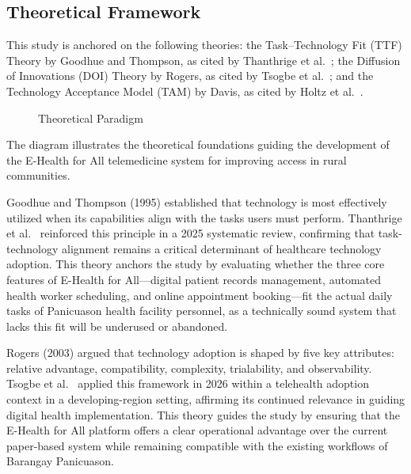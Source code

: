 \documentclass{research}
\begin{document}
\subsection*{Theoretical Framework}

This study is anchored on the following theories: the Task--Technology Fit (TTF) Theory by
Goodhue and Thompson, as cited by Thanthrige et al.\ \cite{Thanthrige2025}; the Diffusion of
Innovations (DOI) Theory by Rogers, as cited by Tsogbe et al.\ \cite{Tsogbe2026}; and the
Technology Acceptance Model (TAM) by Davis, as cited by Holtz et al.\ \cite{Holtz2022}.

\begin{figure}[H]
  \centering
  \caption{Theoretical Paradigm}
  \label{fig:theoretical}
\end{figure}

The diagram illustrates the theoretical foundations guiding the development of the E-Health for
All telemedicine system for improving access in rural communities.

Goodhue and Thompson (1995) established that technology is most effectively utilized when its
capabilities align with the tasks users must perform. Thanthrige et al.\ \cite{Thanthrige2025}
reinforced this principle in a 2025 systematic review, confirming that task-technology alignment
remains a critical determinant of healthcare technology adoption. This theory anchors the study
by evaluating whether the three core features of E-Health for All---digital patient records
management, automated health worker scheduling, and online appointment booking---fit the actual
daily tasks of Panicuason health facility personnel, as a technically sound system that lacks
this fit will be underused or abandoned.

Rogers (2003) argued that technology adoption is shaped by five key attributes: relative
advantage, compatibility, complexity, trialability, and observability. Tsogbe et al.\
\cite{Tsogbe2026} applied this framework in 2026 within a telehealth adoption context in a
developing-region setting, affirming its continued relevance in guiding digital health
implementation. This theory guides the study by ensuring that the E-Health for All platform
offers a clear operational advantage over the current paper-based system while remaining
compatible with the existing workflows of Barangay Panicuason.
\end{document}
